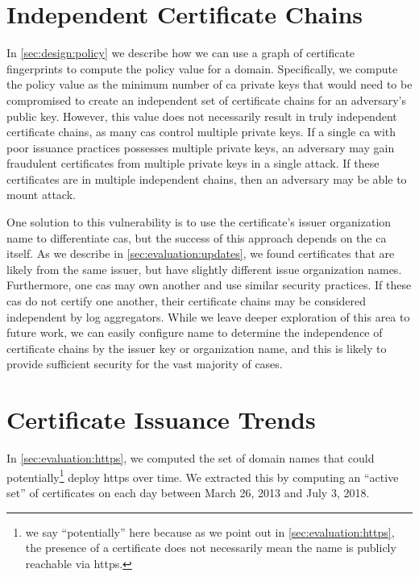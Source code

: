 \section{Independent Certificate Chains}
\label{sec:independence}

In \autoref{sec:design:policy} we describe how we can use a graph of certificate
fingerprints to compute the policy value for a domain. Specifically, we compute
the policy value as the minimum number of \ac{ca} private keys that would need
to be compromised to create an independent set of certificate chains for an
adversary's public key. However, this value does not necessarily result in truly
independent certificate chains, as many \acp{ca} control multiple private keys.
If a single \ac{ca} with poor issuance practices possesses multiple private
keys, an adversary may gain fraudulent certificates from multiple private keys
in a single attack. If these certificates are in multiple independent chains,
then an adversary may be able to mount  attack.

One solution to this vulnerability is to use the certificate's issuer
organization name to differentiate \acp{ca}, but the success of this approach
depends on the \ac{ca} itself. As we describe in
\autoref{sec:evaluation:updates}, we found certificates that are likely from the
same issuer, but have slightly different issue organization names. Furthermore,
one \acp{ca} may own another and use similar security practices. If these
\acp{ca} do not certify one another, their certificate chains may be considered
independent by log aggregators. While we leave deeper exploration of this area
to future work, we can easily configure \ac{name} to determine the independence
of certificate chains by the issuer key or organization name, and this is likely
to provide sufficient security for the vast majority of cases.

\section{Certificate Issuance Trends}
\label{sec:certificates}

In \autoref{sec:evaluation:https}, we computed the set of domain names that
could potentially\footnote{we say ``potentially'' here because as we point out
in \autoref{sec:evaluation:https}, the presence of a certificate does not
necessarily mean the name is publicly reachable via \ac{https}.} deploy
\ac{https} over time. We extracted this by computing an ``active set'' of
certificates on each day between March 26, 2013 and July 3, 2018.

